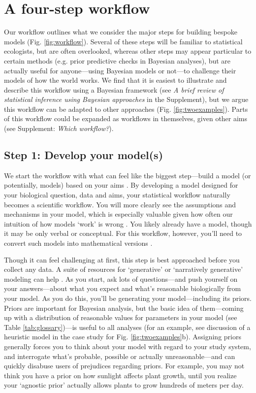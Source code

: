 \documentclass[11pt]{article}
\begin{document}
\section*{A four-step workflow}

Our workflow outlines what we consider the major steps for building bespoke models (Fig. \ref{fig:workflow}). Several of these steps will be familiar to statistical ecologists, but are often overlooked, whereas other steps may appear particular to certain methods (e.g. prior predictive checks in Bayesian analyses), but are actually useful for anyone---using Bayesian models or not---to challenge their models of how the world works. We find that it is easiest to illustrate and describe this workflow using a Bayesian framework (see \emph{A brief review of statistical inference using Bayesian approaches} in the Supplement), but we argue this workflow can be adapted to other approaches (Fig. \ref{fig:twoexamples}).
Parts of this workflow could be expanded as workflows in themselves, given other aims (see Supplement: \emph{Which workflow?}). 

\subsection*{Step 1: Develop your model(s)} 

We start the workflow with what can feel like the biggest step---build a model (or potentially, models) based on your aims \citep{hilborn2013ecological}. By developing a model designed for your biological question, data and aims, your statistical workflow naturally becomes a scientific workflow. You will more clearly see the assumptions and mechanisms in your model, which is especially valuable given how often our intuition of how models `work' is wrong \citep{kokko2005useful}. You likely already have a model, though it may be only verbal or conceptual. For this workflow, however, you’ll need to convert such models into mathematical versions \citep{servedio2014not}. 

Though it can feel challenging at first, this step is best approached before you collect any data. A suite of resources for `generative' or `narratively generative' modeling can help \citep{statrethink,betangen}. 
As you start, ask lots of questions---and push yourself on your answers---about what you expect and what's reasonable biologically from your model. 
As you do this, you'll be generating your model---including its priors. Priors are important for Bayesian analysis, but the basic idea of them---coming up with a distribution of reasonable values for parameters in your model (see Table \ref{tab:glossary})---is useful to all analyses (for an example, see discussion of a heuristic model in the case study for Fig.  \ref{fig:twoexamples}b). Assigning priors generally forces you to think about your model with regard to your study system, and interrogate what's probable, possible or actually unreasonable---and can quickly disabuse users of prejudices regarding priors. For example, you may not think you have a prior on how sunlight affects plant growth, until you realize your `agnostic prior' actually allows plants to grow hundreds of meters per day. 
\end{document}
